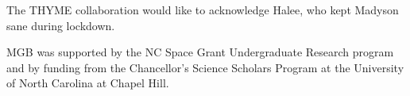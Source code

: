 \documentclass[twocolumn]{aastex631}
\newcommand{\ktwo}{{\textit K2}}
\begin{document}
\begin{acknowledgements}
The THYME collaboration would like to acknowledge Halee, who kept Madyson sane during lockdown.

MGB was supported by the NC Space Grant Undergraduate Research program and by funding from the Chancellor's Science Scholars Program at the University of North Carolina at Chapel Hill.



\end{acknowledgements}
\end{document}
